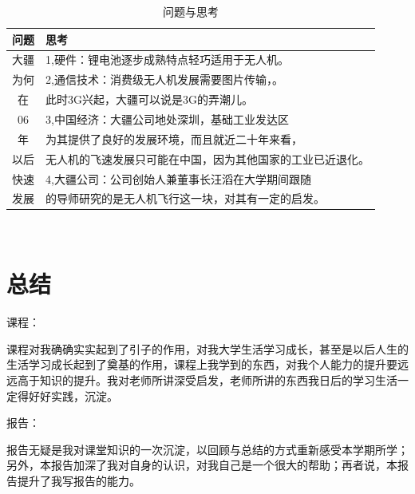 \documentclass{article}
\begin{document}
\begin{table}[h]
	\centering
	\caption{问题与思考}
	\begin{tabular}{cl}
		\hline
		问题 &                      思考 \\
		\hline
		大疆 &1,硬件：锂电池逐步成熟特点轻巧适用于无人机。\\ 
		为何 &2,通信技术：消费级无人机发展需要图片传输，。\\
	    在  &  此时3G兴起，大疆可以说是3G的弄潮儿。\\
        06 &3,中国经济：大疆公司地处深圳，基础工业发达区\\
	    年  &  为其提供了良好的发展环境，而且就近二十年来看，\\
	    以后 &  无人机的飞速发展只可能在中国，因为其他国家的工业已近退化。\\
	    快速 & 4,大疆公司：公司创始人兼董事长汪滔在大学期间跟随\\
		  发展 &的导师研究的是无人机飞行这一块，对其有一定的启发。\\
		\hline
	\end{tabular}
	\label{table1}
\end{table}
　　


\section{总结}
课程：\par
课程对我确确实实起到了引子的作用，对我大学生活学习成长，甚至是以后人生的生活学习成长起到了奠基的作用，课程上我学到的东西，对我个人能力的提升要远远高于知识的提升。我对老师所讲深受启发，老师所讲的东西我日后的学习生活一定得好好实践，沉淀。\par
报告：\par
报告无疑是我对课堂知识的一次沉淀，以回顾与总结的方式重新感受本学期所学；另外，本报告加深了我对自身的认识，对我自己是一个很大的帮助；再者说，本报告提升了我写报告的能力。
\end{document}

